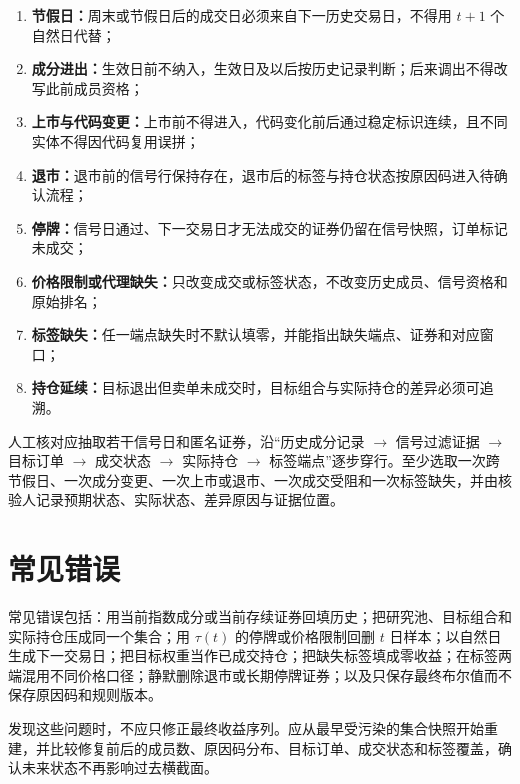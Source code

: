 \begin{enumerate}
  \item \textbf{节假日：}周末或节假日后的成交日必须来自下一历史交易日，不得用 \(t+1\) 个自然日代替；
  \item \textbf{成分进出：}生效日前不纳入，生效日及以后按历史记录判断；后来调出不得改写此前成员资格；
  \item \textbf{上市与代码变更：}上市前不得进入，代码变化前后通过稳定标识连续，且不同实体不得因代码复用误拼；
  \item \textbf{退市：}退市前的信号行保持存在，退市后的标签与持仓状态按原因码进入待确认流程；
  \item \textbf{停牌：}信号日通过、下一交易日才无法成交的证券仍留在信号快照，订单标记未成交；
  \item \textbf{价格限制或代理缺失：}只改变成交或标签状态，不改变历史成员、信号资格和原始排名；
  \item \textbf{标签缺失：}任一端点缺失时不默认填零，并能指出缺失端点、证券和对应窗口；
  \item \textbf{持仓延续：}目标退出但卖单未成交时，目标组合与实际持仓的差异必须可追溯。
\end{enumerate}

\begin{practicebox}
人工核对应抽取若干信号日和匿名证券，沿“历史成分记录 \(\rightarrow\) 信号过滤证据 \(\rightarrow\) 目标订单 \(\rightarrow\) 成交状态 \(\rightarrow\) 实际持仓 \(\rightarrow\) 标签端点”逐步穿行。至少选取一次跨节假日、一次成分变更、一次上市或退市、一次成交受阻和一次标签缺失，并由核验人记录预期状态、实际状态、差异原因与证据位置。
\end{practicebox}

\section{常见错误}

\begin{warningbox}
常见错误包括：用当前指数成分或当前存续证券回填历史；把研究池、目标组合和实际持仓压成同一个集合；用 \(\tau(t)\) 的停牌或价格限制回删 \(t\) 日样本；以自然日生成下一交易日；把目标权重当作已成交持仓；把缺失标签填成零收益；在标签两端混用不同价格口径；静默删除退市或长期停牌证券；以及只保存最终布尔值而不保存原因码和规则版本。
\end{warningbox}

发现这些问题时，不应只修正最终收益序列。应从最早受污染的集合快照开始重建，并比较修复前后的成员数、原因码分布、目标订单、成交状态和标签覆盖，确认未来状态不再影响过去横截面。


